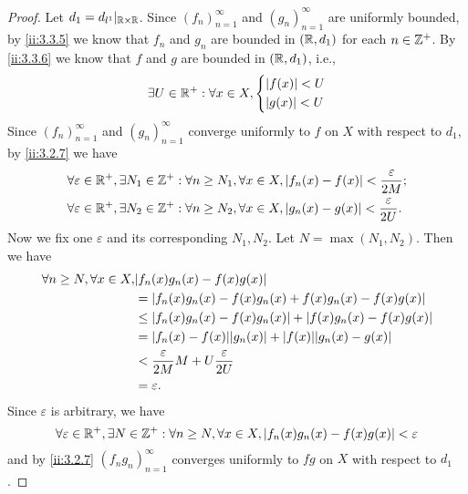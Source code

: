 \begin{proof}
  Let \(d_1 = d_{l^1}|_{\mathbb{R} \times \mathbb{R}}\).
  Since \((f_n)_{n = 1}^\infty\) and \((g_n)_{n = 1}^\infty\) are uniformly bounded, by \cref{ii:3.3.5} we know that \(f_n\) and \(g_n\) are bounded in \((\mathbb{R}, d_1)\) for each \(n \in \mathbb{Z}^+\).
  By \cref{ii:3.3.6} we know that \(f\) and \(g\) are bounded in \((\mathbb{R}, d_1)\), i.e.,
  \[
    \exists U \in \mathbb{R}^+ : \forall x \in X, \begin{dcases}
      \left\lvert f(x)\right\rvert < U \\
      \left\lvert g(x)\right\rvert < U
    \end{dcases}
  \]
  Since \((f_n)_{n = 1}^\infty\) and \((g_n)_{n = 1}^\infty\) converge uniformly to \(f\) on \(X\) with respect to \(d_1\), by \cref{ii:3.2.7} we have
  \begin{align*}
     & \forall \varepsilon \in \mathbb{R}^+, \exists N_1 \in \mathbb{Z}^+ : \forall n \geq N_1, \forall x \in X, \left\lvert f_n(x) - f(x)\right\rvert < \dfrac{\varepsilon}{2M}; \\
     & \forall \varepsilon \in \mathbb{R}^+, \exists N_2 \in \mathbb{Z}^+ : \forall n \geq N_2, \forall x \in X, \left\lvert g_n(x) - g(x)\right\rvert < \dfrac{\varepsilon}{2U}.
  \end{align*}
  Now we fix one \(\varepsilon\) and its corresponding \(N_1, N_2\).
  Let \(N = \max(N_1, N_2)\).
  Then we have
  \begin{align*}
    \forall n \geq N, \forall x \in X, & \abs{f_n(x) g_n(x) - f(x) g(x)}                                        \\
                                       & = \abs{f_n(x) g_n(x) - f(x) g_n(x) + f(x) g_n(x) - f(x) g(x)}          \\
                                       & \leq \abs{f_n(x) g_n(x) - f(x) g_n(x)} + \abs{f(x) g_n(x) - f(x) g(x)} \\
                                       & = \abs{f_n(x) - f(x)} \abs{g_n(x)} + \abs{f(x)} \abs{g_n(x) - g(x)}    \\
                                       & < \dfrac{\varepsilon}{2M} M + U \dfrac{\varepsilon}{2U}                \\
                                       & = \varepsilon.
  \end{align*}
  Since \(\varepsilon\) is arbitrary, we have
  \[
    \forall \varepsilon \in \mathbb{R}^+, \exists N \in \mathbb{Z}^+ : \forall n \geq N, \forall x \in X, \left\lvert f_n(x) g_n(x) - f(x) g(x)\right\rvert < \varepsilon
  \]
  and by \cref{ii:3.2.7} \((f_n g_n)_{n = 1}^\infty\) converges uniformly to \(fg\) on \(X\) with respect to \(d_1\).
\end{proof}
